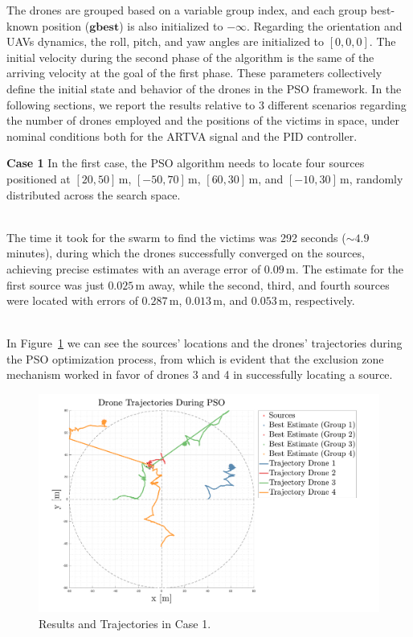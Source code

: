 \documentclass[main]{subfiles}
\begin{document}
The drones are grouped based on a variable group index, and 
each group best-known position ($\mathbf{gbest}$) is also 
initialized to \(-\infty\).
Regarding the orientation and UAVs dynamics, the roll, pitch, and yaw angles
are initialized to \([0, 0, 0]\).
The initial velocity during the second phase of the algorithm is the same
of the arriving velocity at the goal of the first phase.
These parameters collectively define the initial state and behavior of the 
drones in the PSO framework.
In the following sections, we report the results relative to 3 different 
scenarios regarding the number of drones employed and the positions of the victims
in space, under nominal conditions both for the ARTVA signal and the PID controller.

\textbf{Case 1}
In the first case, the PSO algorithm needs to locate four sources positioned 
at \([20, 50] \, \text{m}\), \([-50, 70] \, \text{m}\), \([60, 30] \, \text{m}\), 
and \([-10, 30] \, \text{m}\), 
randomly distributed across the search space.

\noindent\\
The time it took for the swarm to find the victims was 292 seconds (\(\sim 4.9\) minutes),
during which the drones successfully converged on the sources, 
achieving precise estimates with an average error of \(0.09 \, \text{m}\). The estimate for the first source was 
just \(0.025 \, \text{m}\) away, while the second, third, and fourth sources were 
located with errors of \(0.287 \, \text{m}\), \(0.013 \, \text{m}\), and \(0.053 \, \text{m}\), respectively.

\noindent\\
In Figure~\ref{fig:case1} we can see  
the sources' locations and the drones' trajectories during the PSO 
optimization process, from which is evident that the exclusion zone mechanism
worked in favor of drones 3 and 4 in successfully locating a source.

\begin{figure}
    \centering
    \includegraphics[width=1.06\textwidth]{images/case_1.pdf}
    \caption[PSO Case 1]{Results and Trajectories in Case 1.}
    \label{fig:case1}
\end{figure}
\end{document}
